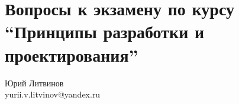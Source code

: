 \documentclass[a5paper]{article}
\begin{document}
\thispagestyle{empty}

\section*{Вопросы к экзамену по курсу \enquote{Принципы разработки и проектирования}}

\begin{flushright}\begin{small}Юрий Литвинов\\\small{yurii.v.litvinov@yandex.ru}\end{small}\end{flushright}
\end{document}
